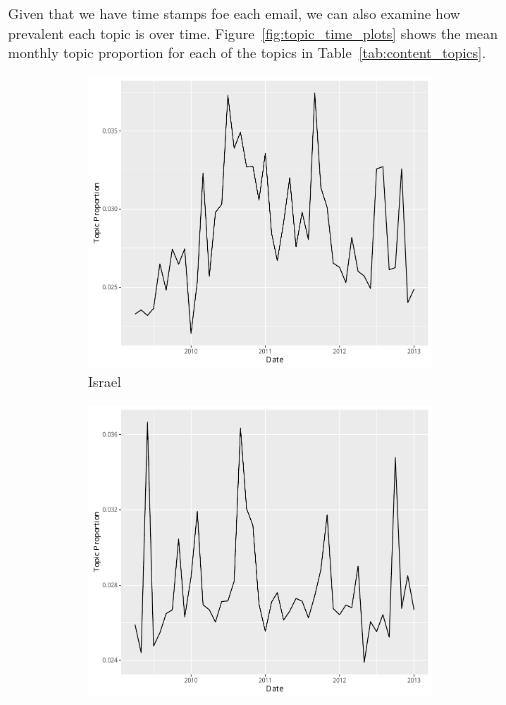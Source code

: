 \documentclass[12pt]{article}
\theoremstyle{definition}
\theoremstyle{algodesc}
\begin{document}
Given that we have time stamps foe each email, we can also examine how prevalent each topic is over time. Figure~\ref{fig:topic_time_plots} shows the mean monthly topic proportion for each of the topics in Table~\ref{tab:content_topics}.

\begin{figure}[htb]
\centering
\begin{subfigure}[Israel]{.30\linewidth}
    \includegraphics[width=\linewidth]{../images/time_plot6.pdf}
    \caption{Israel} \label{fig:t1}
\end{subfigure}
\begin{subfigure}[Elections]{.30\linewidth}
    \includegraphics[width=\linewidth]{../images/time_plot11.pdf}

\end{subfigure}
\end{figure}
\end{document}
